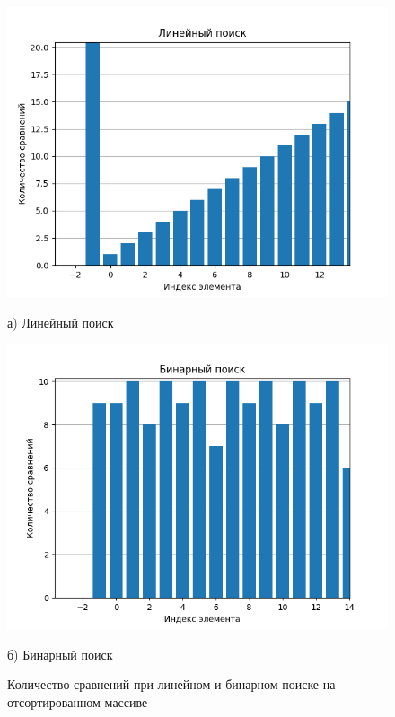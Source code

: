 \begin{figure}[H]
    \centering
    \begin{minipage}[t]{0.48\textwidth}
        \centering
        \includegraphics[width=\linewidth]{inc/img/linear_9.png}
        \caption*{а) Линейный поиск}
    \end{minipage}
    \hfill 
    \begin{minipage}[t]{0.48\textwidth}
        \centering
        \includegraphics[width=\linewidth]{inc/img/binary_9.png}
        \caption*{б) Бинарный поиск}
    \end{minipage}

    \caption{Количество сравнений при линейном и бинарном поиске на отсортированном массиве}
    \label{fig:linear_vs_binary}
\end{figure}

